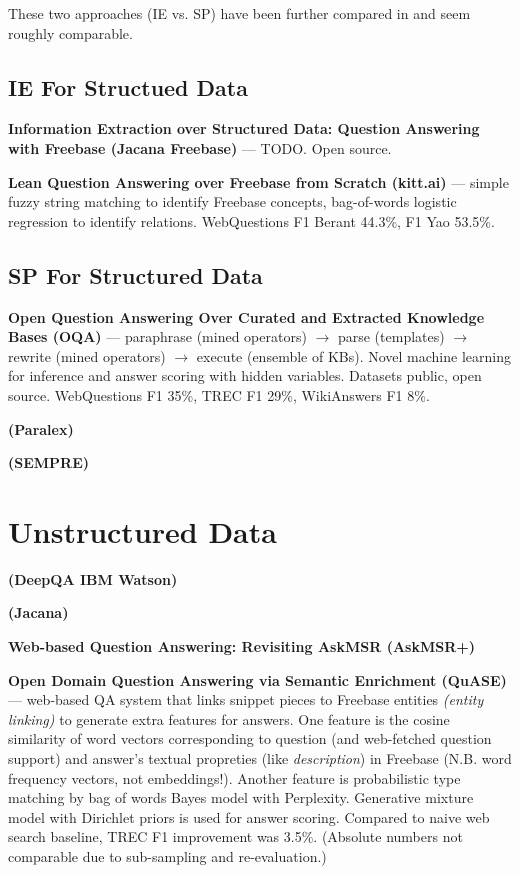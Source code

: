 \documentclass[11pt,a4paper]{article}
\begin{document}
These two approaches (IE vs. SP) have been further compared in \cite{FreebaseQA2014Yao}
and seem roughly comparable.

\subsection{IE For Structued Data}

\textbf{Information Extraction over Structured Data: Question Answering with Freebase (Jacana Freebase)} \cite{TreeFreebase2014Yao}
	--- TODO.
		Open source.

\textbf{Lean Question Answering over Freebase from Scratch (kitt.ai)} \cite{LeanFreebaseYao}
	--- simple fuzzy string matching to identify Freebase concepts,
		bag-of-words logistic regression to identify relations.
		WebQuestions F1 Berant 44.3\%, F1 Yao 53.5\%.

\subsection{SP For Structured Data}

\textbf{Open Question Answering Over Curated and Extracted Knowledge Bases (OQA)} \cite{OQA}
	--- paraphrase (mined operators) $\to$ parse (templates) $\to$ rewrite (mined operators) $\to$ execute (ensemble of KBs).
	Novel machine learning for inference and answer scoring with hidden variables.
	Datasets public, open source.
	WebQuestions F1 35\%, TREC F1 29\%, WikiAnswers F1 8\%.

\textbf{(Paralex)}

\textbf{(SEMPRE)}

\section{Unstructured Data}

\textbf{(DeepQA IBM Watson)}

\textbf{(Jacana)}

\textbf{Web-based Question Answering: Revisiting AskMSR (AskMSR+)}

\textbf{Open Domain Question Answering via Semantic Enrichment (QuASE)} \cite{QuASE}
	--- web-based QA system that links snippet pieces to Freebase entities
	\textit{(entity linking)} to generate extra features for answers.
	One feature is the cosine similarity of word
	vectors corresponding to question (and web-fetched question support)
	and answer's textual propreties (like \textit{description}) in Freebase
	(N.B. word frequency vectors, not embeddings!).
	Another feature is probabilistic type matching by bag of words Bayes model
	with Perplexity.  Generative mixture model with Dirichlet priors is used
	for answer scoring.  Compared to naive web search baseline, TREC F1
	improvement was 3.5\%.  (Absolute numbers not comparable due to
	sub-sampling and re-evaluation.)



\end{document}
